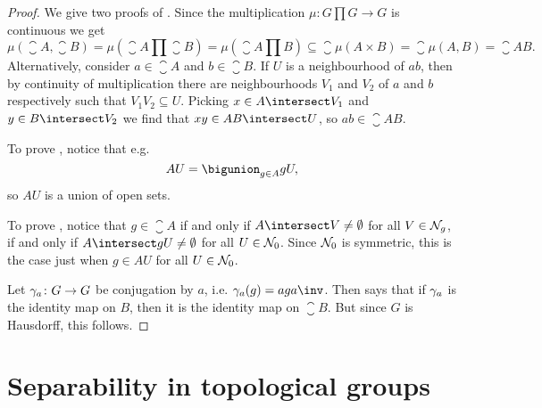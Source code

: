 \documentclass[article, a4paper, 11pt, oneside]{memoir}
\numberwithin{equation}{chapter}
\begin{document}
\begin{proof}
    We give two proofs of . Since the multiplication $\mu \colon G \prod G \to G$ is continuous we get
    \begin{equation*}
        \mu(\closure{A}, \closure{B})
            = \mu(\closure{A} \prod \closure{B})
            = \mu(\closure{A \prod B})
            \subseteq \closure{\mu(A \times B)}
            = \closure{\mu(A, B)}
            = \closure{AB}.
    \end{equation*}
    Alternatively, consider $a \in \closure{A}$ and $b \in \closure{B}$. If $U$ is a neighbourhood of $ab$, then by continuity of multiplication there are neighbourhoods $V_1$ and $V_2$ of $a$ and $b$ respectively such that $V_1 V_2 \subseteq U$. Picking $x \in A \intersect V_1$ and $y \in B \intersect V_2$ we find that $xy \in AB \intersect U$, so $ab \in \closure{AB}$.

    To prove , notice that e.g.
    \begin{equation*}
        AU = \bigunion_{g \in A} gU,
    \end{equation*}
    so $AU$ is a union of open sets.

    To prove , notice that $g \in \closure{A}$ if and only if $A \intersect V \neq \emptyset$ for all $V \in \mathcal{N}_{g}$, if and only if $A \intersect gU \neq \emptyset$ for all $U \in \mathcal{N}_{0}$. Since $\mathcal{N}_{0}$ is symmetric, this is the case just when $g \in AU$ for all $U \in \mathcal{N}_{0}$.

    Let $\gamma_a \colon G \to G$ be conjugation by $a$, i.e. $\conjmult_a(g) = aga\inv$. Then  says that if $\gamma_a$ is the identity map on $B$, then it is the identity map on $\closure{B}$. But since $G$ is Hausdorff, this follows.
\end{proof}


\section{Separability in topological groups}


\end{document}
